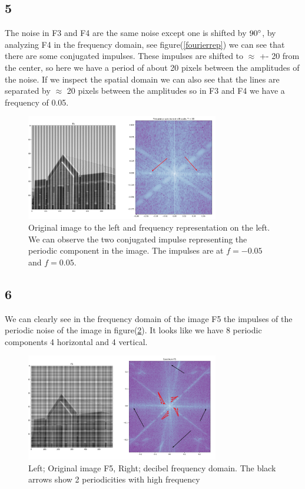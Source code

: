 {\subsection{5}


The noise in F3 and F4 are the same noise except one is shifted by $90\degree$, by analyzing F4 in the frequency domain, see figure(\ref{fourierrep}) we can see that there are some conjugated impulses. These impulses are shifted to $\approx$ +- 20 from the center, so here we have a period of about 20 pixels between the amplitudes of the noise. If we inspect the spatial domain we can also see that the lines are separated by $\approx$ 20 pixels between the amplitudes so in F3 and F4 we have a frequency of 0.05.

\begin{figure}[!htb]
    {\centering
        \includegraphics[width=0.75\textwidth]{simulatedperiod.png}
        \caption{Original image to the left and frequency representation on the left. We can observe the two conjugated impulse representing the periodic component in the image. The impulses are at $f = -0.05$ and $f = 0.05$.}
        \label{simulatedperiod}
    \par}
    \end{figure}




\subsection{6}


We can clearly see in the frequency domain of the image F5 the impulses of the periodic noise of the image in figure(\ref{F5period}). It looks like we have 8 periodic components 4 horizontal and 4 vertical.


\begin{figure}[!htb]
    {\centering
        \includegraphics[width=0.75\textwidth]{superpositionfreq.png}
        \caption{Left; Original image F5, Right; decibel frequency domain. The black arrows show 2 periodicities with high frequency}
        \label{F5period}
    \par}
    \end{figure}


}
